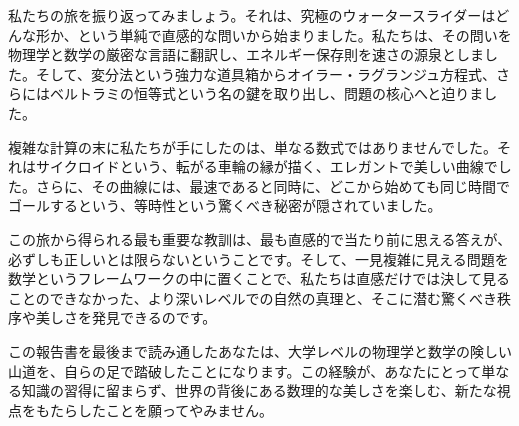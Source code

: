 \documentclass[12pt,a4paper]{ltjsarticle}
\begin{document}
私たちの旅を振り返ってみましょう。それは、究極のウォータースライダーはどんな形か、という単純で直感的な問いから始まりました。私たちは、その問いを物理学と数学の厳密な言語に翻訳し、エネルギー保存則を速さの源泉としました。そして、変分法という強力な道具箱からオイラー・ラグランジュ方程式、さらにはベルトラミの恒等式という名の鍵を取り出し、問題の核心へと迫りました。

複雑な計算の末に私たちが手にしたのは、単なる数式ではありませんでした。それはサイクロイドという、転がる車輪の縁が描く、エレガントで美しい曲線でした。さらに、その曲線には、最速であると同時に、どこから始めても同じ時間でゴールするという、等時性という驚くべき秘密が隠されていました。

この旅から得られる最も重要な教訓は、最も直感的で当たり前に思える答えが、必ずしも正しいとは限らないということです。そして、一見複雑に見える問題を数学というフレームワークの中に置くことで、私たちは直感だけでは決して見ることのできなかった、より深いレベルでの自然の真理と、そこに潜む驚くべき秩序や美しさを発見できるのです。

この報告書を最後まで読み通したあなたは、大学レベルの物理学と数学の険しい山道を、自らの足で踏破したことになります。この経験が、あなたにとって単なる知識の習得に留まらず、世界の背後にある数理的な美しさを楽しむ、新たな視点をもたらしたことを願ってやみません。
\end{document}
